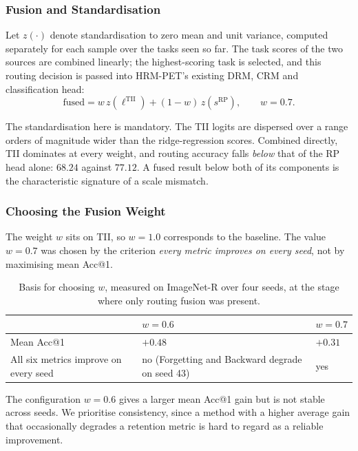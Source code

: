 \documentclass[11pt,a4paper]{article}
\begin{document}
\subsubsection{Fusion and Standardisation}

Let $z(\cdot)$ denote standardisation to zero mean and unit variance, computed
separately for each sample over the tasks seen so far. The task scores of the
two sources are combined linearly; the highest-scoring task is selected, and this
routing decision is passed into HRM-PET's existing DRM, CRM and classification
head:
\begin{equation}
\mathrm{fused} = w\, z(\ell^{\mathrm{TII}}) + (1-w)\, z(s^{\mathrm{RP}}),
\qquad w = 0.7 .
\label{eq:route}
\end{equation}

The standardisation here is mandatory. The TII logits are dispersed over a range
orders of magnitude wider than the ridge-regression scores. Combined directly,
TII dominates at every weight, and routing accuracy falls \emph{below} that of
the RP head alone: $68.24$ against $77.12$. A fused result below both of its
components is the characteristic signature of a scale mismatch.

\subsubsection{Choosing the Fusion Weight}
\label{sec:choose-w}

The weight $w$ sits on TII, so $w = 1.0$ corresponds to the baseline. The value
$w = 0.7$ was chosen by the criterion \emph{every metric improves on every
seed}, not by maximising mean Acc@1.

\begin{table}[htbp]
\centering
\caption{Basis for choosing $w$, measured on ImageNet-R over four seeds, at the
stage where only routing fusion was present.}
\label{tab:choose-w}
\begin{tabular}{@{}p{5.4cm}p{4.6cm}p{2.6cm}@{}}
\toprule
 & $w = 0.6$ & $w = 0.7$ \\
\midrule
Mean Acc@1 & $+0.48$ & $+0.31$ \\
All six metrics improve on every seed
  & no (Forgetting and Backward degrade on seed 43) & yes \\
\bottomrule
\end{tabular}
\end{table}

The configuration $w = 0.6$ gives a larger mean Acc@1 gain but is not stable
across seeds. We prioritise consistency, since a method with a higher average
gain that occasionally degrades a retention metric is hard to regard as a
reliable improvement.
\end{document}

